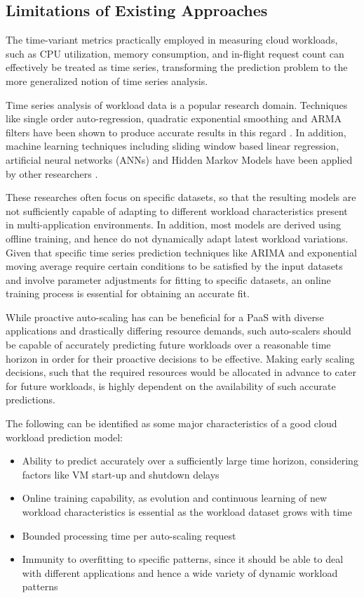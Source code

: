 \subsection{Limitations of Existing Approaches}

The time-variant metrics practically employed in measuring cloud workloads, such as CPU utilization, memory consumption, and in-flight request count can effectively be treated as time series, transforming the prediction problem to the more generalized notion of time series analysis.

Time series analysis of workload data is a popular research domain. Techniques like single order auto-regression, quadratic exponential smoothing and ARMA filters have been shown to produce accurate results in this regard \cite{Kupferman_2009} \cite{Mi_2010} \cite{Roy_2011}. In addition, machine learning techniques including sliding window based linear regression, artificial neural networks (ANNs) and Hidden Markov Models have been applied by other researchers \cite{Yang_2013} \cite{Khan_2012}.

These researches often focus on specific datasets, so that the resulting models are not sufficiently capable of adapting to different workload characteristics present in multi-application environments. In addition, most models are derived using offline training, and hence do not dynamically adapt latest workload variations. Given that specific time series prediction techniques like ARIMA and exponential moving average require certain conditions to be satisfied by the input datasets and involve parameter adjustments for fitting to specific datasets, an online training process is essential for obtaining an accurate fit.


While proactive auto-scaling has can be beneficial for a PaaS with diverse applications and drastically differing resource demands, such auto-scalers should be capable of accurately predicting future workloads over a reasonable time horizon in order for their proactive decisions to be effective.
Making early scaling decisions, such that the required resources would be allocated in advance to cater for future workloads, is highly dependent on the availability of such accurate predictions.

The following can be identified as some major characteristics of a good cloud workload prediction model:

\begin{itemize}
\item Ability to predict accurately over a sufficiently large time horizon, considering factors like VM start-up and shutdown delays
\item Online training capability, as evolution and continuous learning of new workload characteristics is essential as the workload dataset grows with time
\item Bounded processing time per auto-scaling request
\item Immunity to overfitting to specific patterns, since it should be able to deal with different applications and hence a wide variety of dynamic workload patterns
\end{itemize}
